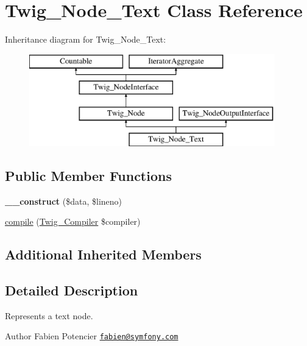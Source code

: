\hypertarget{classTwig__Node__Text}{}\section{Twig\+\_\+\+Node\+\_\+\+Text Class Reference}
\label{classTwig__Node__Text}
Inheritance diagram for Twig\+\_\+\+Node\+\_\+\+Text\+:\begin{figure}[H]
\begin{center}
\leavevmode
\includegraphics[height=4.000000cm]{classTwig__Node__Text}
\end{center}
\end{figure}
\subsection*{Public Member Functions}
\begin{DoxyCompactItemize}
\item 
{\bfseries \+\_\+\+\_\+construct} (\$data, \$lineno)\hypertarget{classTwig__Node__Text_a02da16aee9ecd1a68ddc25ab7e01ae1e}{}\label{classTwig__Node__Text_a02da16aee9ecd1a68ddc25ab7e01ae1e}

\item 
\hyperlink{classTwig__Node__Text_a4efe04c60def43515fd64ab24c5d8c90}{compile} (\hyperlink{classTwig__Compiler}{Twig\+\_\+\+Compiler} \$compiler)
\end{DoxyCompactItemize}
\subsection*{Additional Inherited Members}


\subsection{Detailed Description}
Represents a text node.

\begin{DoxyAuthor}{Author}
Fabien Potencier \href{mailto:fabien@symfony.com}{\tt fabien@symfony.\+com} 
\end{DoxyAuthor}


